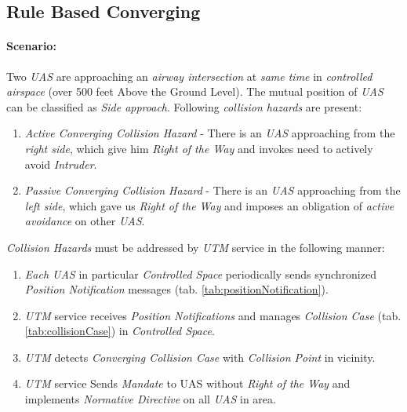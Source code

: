 \subsection{Rule Based Converging}\label{s:testRuleConverging}

\paragraph{Scenario:} Two \emph{UAS} are approaching an \emph{airway intersection} at \emph{same time} in \emph{controlled airspace} (over 500 feet Above the Ground Level). The mutual position of \emph{UAS} can be classified as \emph{Side approach}. Following \emph{collision hazards} are present:

\begin{enumerate}
    \item \emph{Active Converging Collision Hazard} -  There is an \emph{UAS} approaching from the \emph{right side}, which give him \emph{Right of the Way} and invokes need to actively avoid \emph{Intruder}.

	\item \emph{Passive Converging Collision Hazard} - There is an \emph{UAS} approaching from the \emph{left side}, which gave us \emph{Right of the Way} and imposes an obligation of \emph{active avoidance} on other \emph{UAS}.
	
\end{enumerate}


\noindent\emph{Collision Hazards} must be addressed by \emph{UTM} service in the following manner:


\begin{enumerate}
	\item \emph{Each UAS} in particular \emph{Controlled Space} periodically sends synchronized \emph{Position Notification} messages (tab. \ref{tab:positionNotification}). 
	
	\item \emph{UTM} service receives \emph{Position Notifications} and manages \emph{Collision Case} (tab. \ref{tab:collisionCase}) in \emph{Controlled Space}. 
	
	\item \emph{UTM} detects \emph{Converging Collision Case} with \emph{Collision Point} in  vicinity.
	
	\item \emph{UTM} service Sends \emph{Mandate} to UAS without \emph{Right of the Way} and implements \emph{Normative Directive} on all \emph{UAS} in area.
\end{enumerate}



